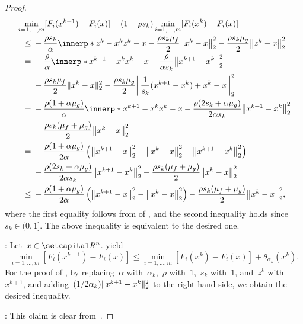 \documentclass[../../main]{subfiles}
\begin{document}
\begin{proof}
    \begin{align}
        \MoveEqLeft \min_{i = 1, \dots, m} [F_i(x^{k + 1}) - F_i(x)] - (1 - \rho s_k) \min_{i = 1, \dots, m} [F_i(x^k) - F_i(x)] \\
        \le{}& - \frac{\rho s_k}{\alpha} \innerp*{z^k - x^k}{z^k - x} - \frac{\rho s_k \mu_f}{2} \norm*{x^k - x}_2^2 - \frac{\rho s_k \mu_g}{2} \norm*{z^k - x}_2^2 \\
        ={}& - \frac{\rho}{\alpha} \innerp*{x^{k + 1} - x^k}{x^k - x} - \frac{\rho}{\alpha s_k} \norm*{x^{k + 1} - x^k}_2^2 \\
             &- \frac{\rho s_k \mu_f}{2} \norm{x^k - x}_2^2 - \frac{\rho s_k \mu_g}{2} \norm*{\frac{1}{s_k} (x^{k + 1} - x^k) + x^k - x}_2^2 \\
        ={}& - \frac{\rho (1 + \alpha \mu_g)}{\alpha} \innerp*{x^{k + 1} - x^k}{x^k - x} - \frac{\rho (2 s_k + \alpha \mu_g)}{2 \alpha s_k} \norm*{x^{k + 1} - x^k}_2^2  \\
             &- \frac{\rho s_k (\mu_f + \mu_g)}{2} \norm*{x^k - x}_2^2 \\
        ={}& - \frac{\rho (1 + \alpha \mu_g)}{2 \alpha} \left( \norm*{x^{k + 1} - x}_2^2 - \norm*{x^k - x}_2^2 - \norm*{x^{k + 1} - x^k}_2^2 \right) \\
           &- \frac{\rho (2 s_k + \alpha \mu_g)}{2 \alpha s_k} \norm*{x^{k + 1} - x^k}_2^2 - \frac{\rho s_k (\mu_f + \mu_g)}{2} \norm*{x^k - x}_2^2 \\
        \le{}& - \frac{\rho (1 + \alpha \mu_g)}{2 \alpha} \left( \norm*{x^{k + 1} - x}_2^2 - \norm*{x^k - x}_2^2 \right) - \frac{\rho s_k (\mu_f + \mu_g)}{2} \norm*{x^k - x}_2^2
    ,\end{align}
    where the first equality follows from  of , and the second inequality holds since~$s_k \in (0, 1]$.
    The above inequality is equivalent to the desired one.

    :
    Let~$x \in \setR^n$.
     yield
    \begin{equation}
        \min_{i = 1, \dots, m} [F_i(x^{k + 1}) - F_i(x)] \le \min_{i = 1, \dots, m} [F_i(x^k) - F_i(x)] + \theta_{\alpha_k}(x^k)
    .\end{equation}
    For the proof of , by replacing~$\alpha$ with~$\alpha_k$,~$\rho$ with~$1$,~$s_k$ with~$1$, and~$z^k$ with~$x^{k + 1}$, and adding~$(1 / 2 \alpha_k) \lVert x^{k + 1} - x^k\rVert_2^2$ to the right-hand side, we obtain the desired inequality.

    :
    This claim is clear from~.
\end{proof}
\end{document}
